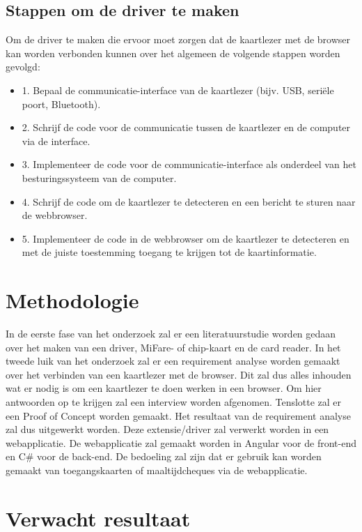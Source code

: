 \subsection{Stappen om de driver te maken}
Om de driver te maken die ervoor moet zorgen dat de kaartlezer met de browser kan worden verbonden kunnen over het algemeen de volgende stappen worden gevolgd:
\begin{itemize}
    \item 1. Bepaal de communicatie-interface van de kaartlezer (bijv. USB, seriële poort, Bluetooth).
    \item 2. Schrijf de code voor de communicatie tussen de kaartlezer en de computer via de interface.
    \item 3. Implementeer de code voor de communicatie-interface als onderdeel van het besturingssysteem van de computer.
    \item 4. Schrijf de code om de kaartlezer te detecteren en een bericht te sturen naar de webbrowser.
    \item 5. Implementeer de code in de webbrowser om de kaartlezer te detecteren en met de juiste toestemming toegang te krijgen tot de kaartinformatie.
\end{itemize}

\section{Methodologie}%
\label{sec:methodologie}

In de eerste fase van het onderzoek zal er een literatuurstudie worden gedaan over het maken van een driver, MiFare- of chip-kaart en de card reader. In het tweede luik van het onderzoek zal er een requirement analyse worden gemaakt over het verbinden van een kaartlezer met de browser. Dit zal dus alles inhouden wat er nodig is om een kaartlezer te doen werken in een browser. Om hier antwoorden op te krijgen zal een interview worden afgenomen. Tenslotte zal er een Proof of Concept worden gemaakt. Het resultaat van de requirement analyse zal dus uitgewerkt worden. Deze extensie/driver zal verwerkt worden in een webapplicatie. De webapplicatie zal gemaakt worden in Angular voor de front-end en C\# voor de back-end. De bedoeling zal zijn dat er gebruik kan worden gemaakt van toegangskaarten of maaltijdcheques via de webapplicatie.

\section{Verwacht resultaat}%
\label{sec:verwachte_resultaten}

